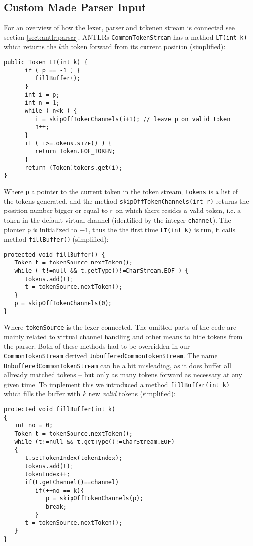 \subsection{Custom Made Parser Input}
For an overview of how the lexer, parser and tokenen stream is connected see section \ref{sect:antlr:parser}. ANTLRs \verb!CommonTokenStream! has a method \verb!LT(int k)! which returns the $k$th token forward from its current position (simplified):
\begin{Verbatim}
public Token LT(int k) {
      if ( p == -1 ) {
         fillBuffer();
      }
      int i = p;
      int n = 1;
      while ( n<k ) {
         i = skipOffTokenChannels(i+1); // leave p on valid token
         n++;
      }
      if ( i>=tokens.size() ) {
         return Token.EOF_TOKEN;
      }
      return (Token)tokens.get(i);
}
\end{Verbatim}
Where \verb!p! a pointer to the current token in the token stream, \verb!tokens! is a list of the tokens generated, and the method \verb!skipOffTokenChannels(int r)! returns the position number bigger or equal to \verb!r! on which there resides a valid token, i.e. a token in the default virtual channel (identified by the integer \verb!channel!). The pionter \verb!p! is initialized to $-1$, thus the the first time \verb!LT(int k)! is run, it calls method \verb!fillBuffer()! (simplified):
\begin{Verbatim}
protected void fillBuffer() {
   Token t = tokenSource.nextToken();
   while ( t!=null && t.getType()!=CharStream.EOF ) {
      tokens.add(t);
      t = tokenSource.nextToken();
   }
   p = skipOffTokenChannels(0);
}
\end{Verbatim}
Where \verb!tokenSource! is the lexer connected. The omitted parts of the code are mainly related to virtual channel handling and other means to hide tokens from the parser. Both of these methods had to be overridden in our \verb!CommonTokenStream! derived \verb!UnbufferedCommonTokenStream!. The name \verb!UnbufferedCommonTokenStream! can be a bit misleading, as it does buffer all allready matched tokens -- but only as many tokens forward as necessary at any given time. To implement this we introduced a method \verb!fillBuffer(int k)! which fills the buffer with $k$ new \emph{valid} tokens (simplified):
\begin{Verbatim}
protected void fillBuffer(int k) 
{
   int no = 0;
   Token t = tokenSource.nextToken();
   while (t!=null && t.getType()!=CharStream.EOF) 
   {
      t.setTokenIndex(tokenIndex);
      tokens.add(t);
      tokenIndex++;
      if(t.getChannel()==channel)
         if(++no == k){
            p = skipOffTokenChannels(p);
            break;
         }
      t = tokenSource.nextToken();
   }
}
\end{Verbatim}
